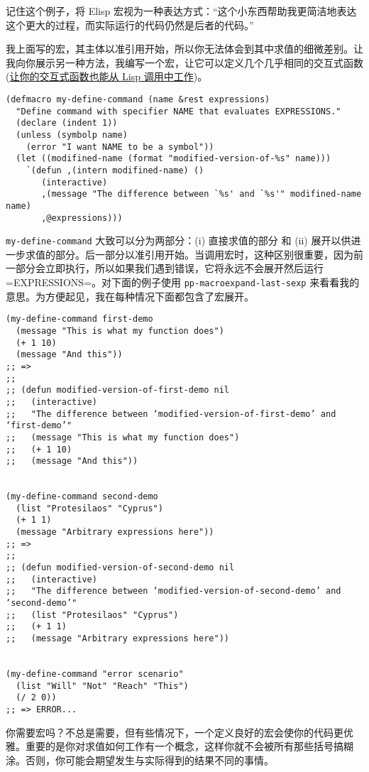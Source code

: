 \documentclass[11pt]{ctexart}
\begin{document}
记住这个例子，将 Elisp 宏视为一种表达方式：“这个小东西帮助我更简洁地表达这个更大的过程，而实际运行的代码仍然是后者的代码。”

我上面写的宏，其主体以准引用开始，所以你无法体会到其中求值的细微差别。让我向你展示另一种方法，我编写一个宏，让它可以定义几个几乎相同的交互式函数 (\hyperref[sec:orgf9b460c]{让你的交互式函数也能从 Lisp 调用中工作})。

\begin{verbatim}
(defmacro my-define-command (name &rest expressions)
  "Define command with specifier NAME that evaluates EXPRESSIONS."
  (declare (indent 1))
  (unless (symbolp name)
    (error "I want NAME to be a symbol"))
  (let ((modifined-name (format "modified-version-of-%s" name)))
    `(defun ,(intern modifined-name) ()
       (interactive)
       ,(message "The difference between `%s' and `%s'" modifined-name name)
       ,@expressions)))
\end{verbatim}

\texttt{my-define-command} 大致可以分为两部分：(i) 直接求值的部分 和 (ii) 展开以供进一步求值的部分。后一部分以准引用开始。当调用宏时，这种区别很重要，因为前一部分会立即执行，所以如果我们遇到错误，它将永远不会展开然后运行 =EXPRESSIONS=。对下面的例子使用 \texttt{pp-macroexpand-last-sexp} 来看看我的意思。为方便起见，我在每种情况下面都包含了宏展开。

\begin{verbatim}
(my-define-command first-demo
  (message "This is what my function does")
  (+ 1 10)
  (message "And this"))
;; =>
;;
;; (defun modified-version-of-first-demo nil
;;   (interactive)
;;   "The difference between ‘modified-version-of-first-demo’ and ‘first-demo’"
;;   (message "This is what my function does")
;;   (+ 1 10)
;;   (message "And this"))


(my-define-command second-demo
  (list "Protesilaos" "Cyprus")
  (+ 1 1)
  (message "Arbitrary expressions here"))
;; =>
;;
;; (defun modified-version-of-second-demo nil
;;   (interactive)
;;   "The difference between ‘modified-version-of-second-demo’ and ‘second-demo’"
;;   (list "Protesilaos" "Cyprus")
;;   (+ 1 1)
;;   (message "Arbitrary expressions here"))


(my-define-command "error scenario"
  (list "Will" "Not" "Reach" "This")
  (/ 2 0))
;; => ERROR...
\end{verbatim}

你需要宏吗？不总是需要，但有些情况下，一个定义良好的宏会使你的代码更优雅。重要的是你对求值如何工作有一个概念，这样你就不会被所有那些括号搞糊涂。否则，你可能会期望发生与实际得到的结果不同的事情。
\end{document}

